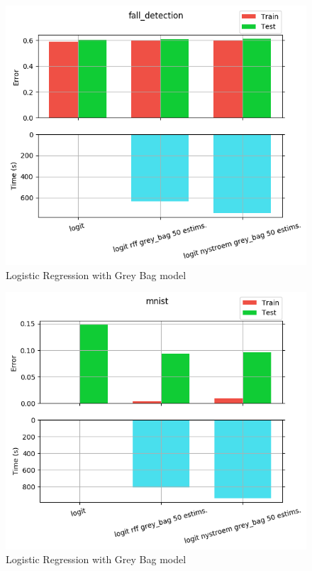 \begin{figure}[th]
\centering
\includegraphics[scale=\imgscale]{Figures/2_3/fall_detection}
\decoRule
\caption[2.3 fall\tu detection]{Logistic Regression with Grey Bag model}
\label{fig:2_3_fall_detection}
\end{figure}

\begin{figure}[th]
\centering
\includegraphics[scale=\imgscale]{Figures/2_3/mnist}
\decoRule
\caption[2.3 mnist]{Logistic Regression with Grey Bag model}
\label{fig:2_3_mnist}
\end{figure}

